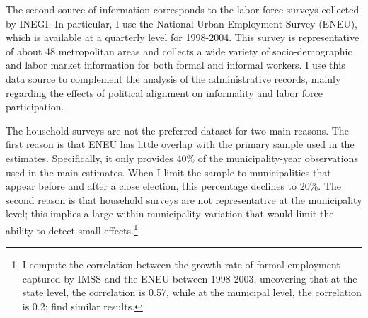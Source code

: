 \documentclass[dv_diss_main.tex]{subfiles}
\begin{document}

The second source of information corresponds to the labor force surveys collected by INEGI. In particular, I use the National Urban Employment Survey (ENEU), which is available at a quarterly level for 1998-2004. This survey is representative of about 48 metropolitan areas and collects a wide variety of socio-demographic and labor market information for both formal and informal workers. I use this data source to complement the analysis of the administrative records, mainly regarding the effects of political alignment on informality and labor force participation. 

The household surveys are not the preferred dataset for two main reasons. The first reason is that ENEU has little overlap with the primary sample used in the estimates. Specifically, it only provides 40\% of the municipality-year observations used in the main estimates. When I limit the sample to municipalities that appear before and after a close election, this percentage declines to 20\%. The second reason is that household surveys are not representative at the municipality level; this implies a large within municipality variation that would limit the ability to detect small effects.\footnote{
I compute the correlation between the growth rate of formal employment captured by IMSS and the ENEU between 1998-2003, uncovering that at the state level, the correlation is 0.57, while at the municipal level, the correlation is 0.2; \cite{bosch2014trade} find similar results.}
\end{document}
